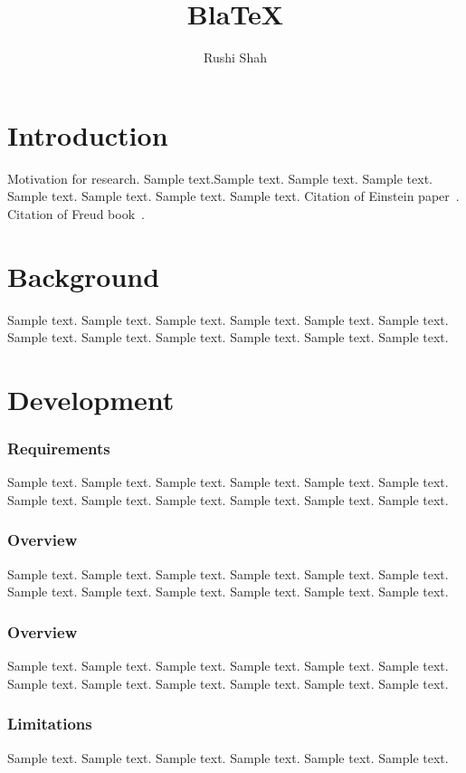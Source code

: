 \documentclass[jou,apacite]{apa6}
\title{BlaTeX}
\author{Rushi Shah}
\affiliation{TJHSST}
\begin{document}
\maketitle    
         
\section{Introduction}
Motivation for research.
Sample text.Sample text. Sample text. Sample text. Sample text. Sample text. 
Sample text. Sample text. Citation of Einstein paper~\cite{Einstein}. Citation of Freud book~\cite{Freud}.

\section{Background}
Sample text. Sample text. Sample text. Sample text. Sample text. Sample text. 
Sample text. Sample text. Sample text. Sample text. Sample text. Sample text. 


\section{Development}

\subsubsection{Requirements}
Sample text. Sample text. Sample text. Sample text. Sample text. Sample text. 
Sample text. Sample text. Sample text. Sample text. Sample text. Sample text. 

\subsubsection{Overview}
Sample text. Sample text. Sample text. Sample text. Sample text. Sample text. 
Sample text. Sample text. Sample text. Sample text. Sample text. Sample text. 

\subsubsection{Overview}
Sample text. Sample text. Sample text. Sample text. Sample text. Sample text. 
Sample text. Sample text. Sample text. Sample text. Sample text. Sample text. 


\subsubsection{Limitations}
Sample text. Sample text. Sample text. Sample text. Sample text. Sample text. 



\end{document}
